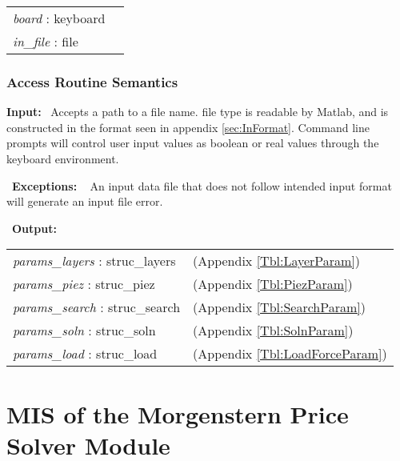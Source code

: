 \documentclass[12pt, titlepage]{article}
\begin{document}
\renewcommand*{\arraystretch}{1.5}
\begin{longtable}{p{} p{}}
  \textit{board} : keyboard & \\

  \textit{in\_file} : file & \\
\end{longtable}

\subsubsection{Access Routine Semantics}
\textbf{Input:} ~\newline\noindent Accepts a path to a file name. file
type is readable by Matlab, and is constructed in the format seen in
appendix \ref{sec:InFormat}. Command line prompts will control user
input values as boolean or real values through the keyboard
environment.

~\newline\noindent \textbf{Exceptions:} ~\newline\noindent
An input data file that does not follow intended input format will
generate an input file error.

~\newline\noindent \textbf{Output:}
\renewcommand*{\arraystretch}{1.5}
\begin{longtable}{p{} p{}}
  \textit{params\_layers} : struc\_layers & (Appendix
  \ref{Tbl:LayerParam})\\

  \textit{params\_piez} : struc\_piez & (Appendix
  \ref{Tbl:PiezParam})\\

  \textit{params\_search} : struc\_search & (Appendix
  \ref{Tbl:SearchParam})\\

  \textit{params\_soln} : struc\_soln & (Appendix
  \ref{Tbl:SolnParam})\\

  \textit{params\_load} : struc\_load & (Appendix
  \ref{Tbl:LoadForceParam})
\end{longtable}



\section{MIS of the Morgenstern Price Solver Module} \label{sec:MPMod}
\end{document}
